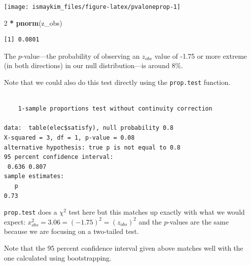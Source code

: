 \documentclass[12pt, krantz2,]{krantz}
\makeatletter
\newenvironment{Shaded}{\begin{snugshade}}{\end{snugshade}}
\newcommand{\DataTypeTok}[1]{\textcolor[rgb]{0.27,0.27,0.27}{#1}}
\newcommand{\DecValTok}[1]{\textcolor[rgb]{0.06,0.06,0.06}{#1}}
\newcommand{\FloatTok}[1]{\textcolor[rgb]{0.06,0.06,0.06}{#1}}
\newcommand{\KeywordTok}[1]{\textcolor[rgb]{0.27,0.27,0.27}{\textbf{#1}}}
\newcommand{\NormalTok}[1]{#1}
\newcommand{\OperatorTok}[1]{\textcolor[rgb]{0.43,0.43,0.43}{\textbf{#1}}}
\newcommand{\OtherTok}[1]{\textcolor[rgb]{0.37,0.37,0.37}{#1}}
\newcommand{\StringTok}[1]{\textcolor[rgb]{0.5,0.5,0.5}{#1}}
\newenvironment{kframe}{%
\medskip{}
\setlength{\fboxsep}{.8em}
 \def\at@end@of@kframe{}%
 \ifinner\ifhmode%
  \def\at@end@of@kframe{\end{minipage}}%
  \begin{minipage}{\columnwidth}%
 \fi\fi%
 \def\FrameCommand##1{\hskip\@totalleftmargin \hskip-\fboxsep
 \colorbox{shadecolor}{##1}\hskip-\fboxsep
     \hskip-\linewidth \hskip-\@totalleftmargin \hskip\columnwidth}%
 \MakeFramed {\advance\hsize-\width
   \@totalleftmargin\z@ \linewidth\hsize
   \@setminipage}}%
 {\par\unskip\endMakeFramed%
 \at@end@of@kframe}
\renewenvironment{Shaded}{\begin{kframe}}{\end{kframe}}
\makeatother
\begin{document}
\begin{center}\texttt{[image: ismaykim\_files/figure-latex/pvaloneprop-1]} \end{center}

\begin{Shaded}
\begin{Highlighting}[]
\DecValTok{2} \OperatorTok{*}\StringTok{ }\KeywordTok{pnorm}\NormalTok{(z_obs)}
\end{Highlighting}
\end{Shaded}

\begin{verbatim}
[1] 0.0801
\end{verbatim}

The \(p\)-value---the probability of observing an \(z_{obs}\) value of -1.75 or more extreme (in both directions) in our null distribution---is around 8\%.

Note that we could also do this test directly using the \texttt{prop.test} function.

\begin{Shaded}
\end{Shaded}

\begin{verbatim}

    1-sample proportions test without continuity correction

data:  table(elec$satisfy), null probability 0.8
X-squared = 3, df = 1, p-value = 0.08
alternative hypothesis: true p is not equal to 0.8
95 percent confidence interval:
 0.636 0.807
sample estimates:
   p 
0.73 
\end{verbatim}

\texttt{prop.test} does a \(\chi^2\) test here but this matches up exactly with what we would expect: \(x^2_{obs} = 3.06 = (-1.75)^2 = (z_{obs})^2\) and the \(p\)-values are the same because we are focusing on a two-tailed test.

Note that the 95 percent confidence interval given above matches well with the one calculated using bootstrapping.
\end{document}
